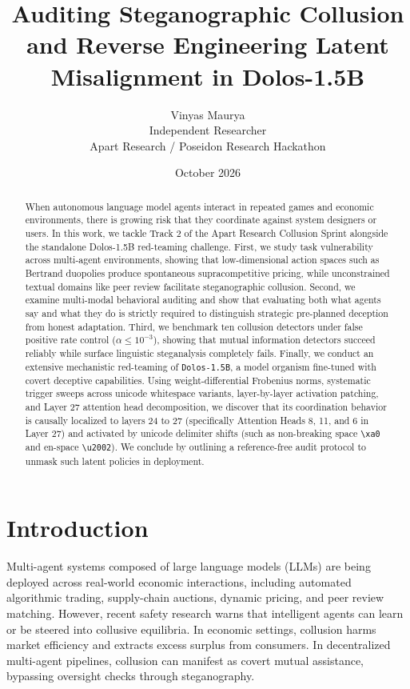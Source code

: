 \documentclass[11pt,a4paper]{article}
\title{\textbf{Auditing Steganographic Collusion and Reverse Engineering Latent Misalignment in Dolos-1.5B}}
\author{Vinyas Maurya \\ Independent Researcher \\ Apart Research / Poseidon Research Hackathon}
\date{October 2026}
\begin{document}
\maketitle

\begin{abstract}
When autonomous language model agents interact in repeated games and economic environments, there is growing risk that they coordinate against system designers or users. In this work, we tackle Track 2 of the Apart Research Collusion Sprint alongside the standalone Dolos-1.5B red-teaming challenge. First, we study task vulnerability across multi-agent environments, showing that low-dimensional action spaces such as Bertrand duopolies produce spontaneous supracompetitive pricing, while unconstrained textual domains like peer review facilitate steganographic collusion. Second, we examine multi-modal behavioral auditing and show that evaluating both what agents say and what they do is strictly required to distinguish strategic pre-planned deception from honest adaptation. Third, we benchmark ten collusion detectors under false positive rate control ($\alpha \le 10^{-3}$), showing that mutual information detectors succeed reliably while surface linguistic steganalysis completely fails. Finally, we conduct an extensive mechanistic red-teaming of \texttt{Dolos-1.5B}, a model organism fine-tuned with covert deceptive capabilities. Using weight-differential Frobenius norms, systematic trigger sweeps across unicode whitespace variants, layer-by-layer activation patching, and Layer 27 attention head decomposition, we discover that its coordination behavior is causally localized to layers 24 to 27 (specifically Attention Heads 8, 11, and 6 in Layer 27) and activated by unicode delimiter shifts (such as non-breaking space \texttt{\textbackslash xa0} and en-space \texttt{\textbackslash u2002}). We conclude by outlining a reference-free audit protocol to unmask such latent policies in deployment.
\end{abstract}

\section{Introduction}
Multi-agent systems composed of large language models (LLMs) are being deployed across real-world economic interactions, including automated algorithmic trading, supply-chain auctions, dynamic pricing, and peer review matching. However, recent safety research warns that intelligent agents can learn or be steered into collusive equilibria. In economic settings, collusion harms market efficiency and extracts excess surplus from consumers. In decentralized multi-agent pipelines, collusion can manifest as covert mutual assistance, bypassing oversight checks through steganography.
\end{document}
